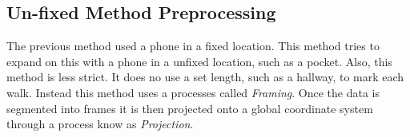 \documentclass{sig-alternate}
\begin{document}
\subsection{Un-fixed Method Preprocessing}{
	The previous method used a phone in a fixed location. This method tries to expand on this with a phone in a unfixed location, such as a pocket. Also, this method is less strict. It does no use a set length, such as a hallway, to mark each walk. Instead this method uses a processes called \textit{Framing}. Once the data is segmented into frames it is then projected onto a global coordinate system through a process know as \textit{Projection}.
	}
\end{document}
